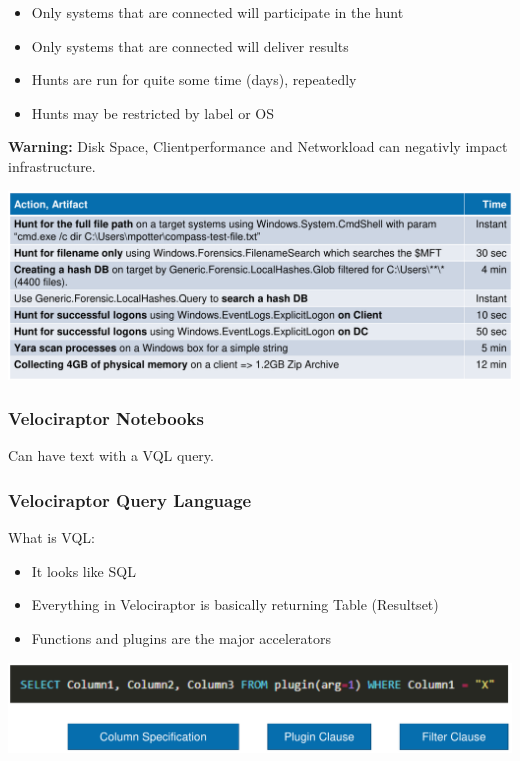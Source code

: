\begin{itemize}
    \item Only systems that are connected will participate in the hunt
    \item Only systems that are connected will deliver results
    \item Hunts are run for quite some time (days), repeatedly
    \item Hunts may be restricted by label or OS
\end{itemize}
\textbf{Warning:} Disk Space, Clientperformance and Networkload can negativly impact infrastructure.

\includegraphics[width=\linewidth]{./img/10-velociraptor/velo_speed}

\subsubsection{Velociraptor Notebooks}
Can have text with a VQL query.

\subsubsection{Velociraptor Query Language}
What is VQL:
\begin{itemize}
    \item It looks like SQL
    \item Everything in Velociraptor is basically returning Table (Resultset)
    \item Functions and plugins are the major accelerators
\end{itemize}
\includegraphics[width=\linewidth]{./img/10-velociraptor/vql.png}

